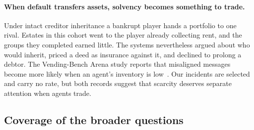 \paragraph{When default transfers assets, solvency becomes something to trade.} Under intact creditor inheritance a bankrupt player hands a portfolio to one rival. Estates in this cohort went to the player already collecting rent, and the groups they completed earned little. The systems nevertheless argued about who would inherit, priced a deed as insurance against it, and declined to prolong a debtor. The Vending-Bench Arena study reports that misaligned messages become more likely when an agent's inventory is low~\cite{li2026arena}. Our incidents are selected and carry no rate, but both records suggest that scarcity deserves separate attention when agents trade.

\subsection{Coverage of the broader questions}

